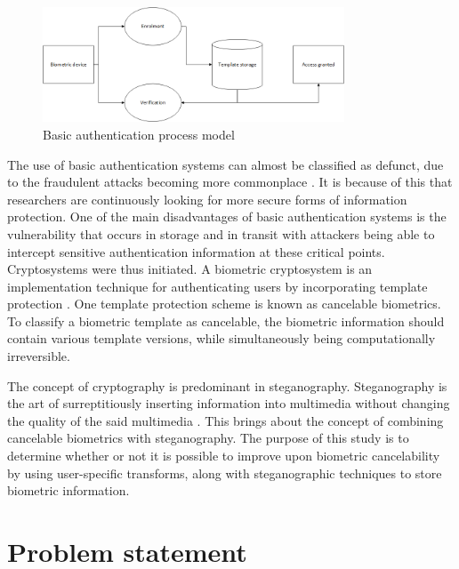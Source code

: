 \begin{figure}[hbtp]
\centering
\includegraphics[width=0.8\textwidth]{Chapter1/Figs/Figure1-1.png}
% 
\caption{ Basic authentication process model}
\label{fig:basic_authentication_process_model}
\end{figure}

The use of basic authentication systems can almost be classified as defunct, due to the fraudulent attacks becoming more commonplace \citep{Kashyap2016}. It is because of this that researchers are continuously looking for more secure forms of information protection. One of the main disadvantages of basic authentication systems is the vulnerability that occurs in storage and in transit with attackers being able to intercept sensitive authentication information at these critical points. Cryptosystems were thus initiated. A biometric cryptosystem is an implementation technique for authenticating users by incorporating template protection \citep{Uludag2004}. One template protection scheme is known as cancelable biometrics. To classify a biometric template as cancelable, the biometric information should contain various template versions, while simultaneously being computationally irreversible. 

The concept of cryptography is predominant in steganography. Steganography is the art of surreptitiously inserting information into multimedia without changing the quality of the said multimedia \citep{Kishor2016}. This brings about the concept of combining cancelable biometrics with steganography.
The purpose of this study is to determine whether or not it is possible to improve upon biometric cancelability by using user-specific transforms, along with steganographic techniques to store biometric information.




\section{Problem statement} %


